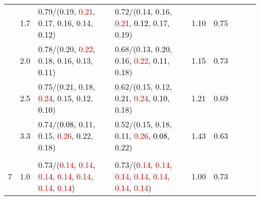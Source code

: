 \documentclass[10pt,a4paper]{report}
\begin{document}
\begin{table}[!htbp]
\begin{center}
{\begin{tabular}{ccllccccc}
				  & 1.7                               & 0.79/(0.19, \textcolor{red}{0.21}, 0.17, 0.16, 0.14, \textcolor{black}{0.12})                                                                                                                 & 0.72/(0.14, 0.16, \textcolor{red}{0.21}, \textcolor{black}{0.12}, 0.17, 0.19)                                                                                                                 & 1.10             & 0.75                     \\
				  & 2.0                               & 0.78/(0.20, \textcolor{red}{0.22}, 0.18, 0.16, 0.13, \textcolor{black}{0.11})                                                                                                                 & 0.68/(0.13, 0.20, 0.16, \textcolor{red}{0.22}, \textcolor{black}{0.11}, 0.18)                                                                                                                 & 1.15             & 0.73                     \\
				  & 2.5                               & 0.75/(0.21, 0.18, \textcolor{red}{0.24}, 0.15, 0.12, \textcolor{black}{0.10})                                                                                                                 & 0.62/(0.15, 0.12, 0.21, \textcolor{red}{0.24}, \textcolor{black}{0.10}, 0.18)                                                                                                                 & 1.21             & 0.69                     \\
				  & 3.3                               & 0.74/(\textcolor{black}{0.08}, 0.11, 0.15, \textcolor{red}{0.26}, 0.22, 0.18)                                                                                                                 & 0.52/(0.15, 0.18, 0.11, \textcolor{red}{0.26}, \textcolor{black}{0.08}, 0.22)                                                                                                                 & 1.43             & 0.63                     \\
				  &                                   &                                                                                                                                                                                               &                                                                                                                                                                                               &                                             \\
				7 & 1.0                               & 0.73/(\textcolor{red}{0.14}, \textcolor{red}{0.14}, \textcolor{red}{0.14}, \textcolor{red}{0.14}, \textcolor{red}{0.14}, \textcolor{red}{0.14}, \textcolor{red}{0.14})                        & 0.73/(\textcolor{red}{0.14}, \textcolor{red}{0.14}, \textcolor{red}{0.14}, \textcolor{red}{0.14}, \textcolor{red}{0.14}, \textcolor{red}{0.14}, \textcolor{red}{0.14})                        & 1.00             & 0.73                     \\

\end{tabular}}
\end{center}
\end{table}
\end{document}
